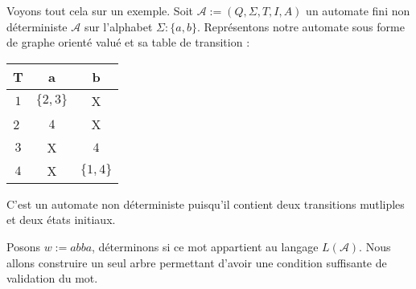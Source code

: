 \begin{example}
    Voyons tout cela sur un exemple. Soit $ \mathcal{A} := (Q,\Sigma, T,I,A)$ un automate fini non déterministe $ \mathcal{A}$
    sur l'alphabet $\Sigma : \{a,b\}$. Représentons notre automate sous forme de graphe orienté valué et sa table de transition :
    \begin{center}
        \begin{minipage}{0.45\textwidth} %
        \end{minipage}%
        \hfill 
        \begin{minipage}{0.45\textwidth} %
            \begin{tabular}{c|c|c}
                T & a & b \\ \hline 
                $1$ & $\{2,3\}$ & X \\ \hline 
                \textcircled{2} & $4$ & X \\ \hline 
                $3$ & X & $4$ \\ \hline 
                $4$ & X & $\{1,4\}$ 
            \end{tabular}
        \end{minipage}
    \end{center}
    C'est un automate non déterministe puisqu'il contient deux transitions mutliples et deux états initiaux. 

    Posons $w := abba$, déterminons si ce mot appartient au langage $L( \mathcal{A})$. Nous allons construire 
    un seul arbre permettant d'avoir une condition suffisante de validation du mot. 


\end{example}
